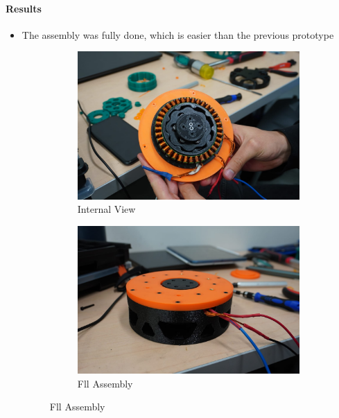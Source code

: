 \documentclass{article}
\begin{document}
\paragraph[short]{Results}
\begin{itemize}
    \item The assembly was fully done, which is easier than the previous prototype
    \begin{figure}[H]
        \centering
        \begin{subfigure}{.5\textwidth}
          \centering
          \includegraphics[width=.9\linewidth]{Images/Motor/IntCycV2A.jpg}
          \caption{Internal View}
          
        \end{subfigure}%
        \begin{subfigure}{.5\textwidth}
          \centering
          \includegraphics[width=.9\linewidth]{Images/Motor/IntCycV2B.jpg}
          \caption{Fll Assembly}
          
        \end{subfigure}
       

\end{figure}
\end{itemize}
\end{document}
